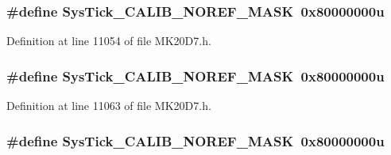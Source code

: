\subsubsection[{\texorpdfstring{Sys\+Tick\+\_\+\+C\+A\+L\+I\+B\+\_\+\+N\+O\+R\+E\+F\+\_\+\+M\+A\+SK}{SysTick_CALIB_NOREF_MASK}}]{\setlength{\rightskip}{0pt plus 5cm}\#define Sys\+Tick\+\_\+\+C\+A\+L\+I\+B\+\_\+\+N\+O\+R\+E\+F\+\_\+\+M\+A\+SK~0x80000000u}\hypertarget{group___sys_tick___register___masks_gabca0ac6719f78220d81d2fc1328d5a45}{}\label{group___sys_tick___register___masks_gabca0ac6719f78220d81d2fc1328d5a45}


Definition at line 11054 of file M\+K20\+D7.\+h.

\subsubsection[{\texorpdfstring{Sys\+Tick\+\_\+\+C\+A\+L\+I\+B\+\_\+\+N\+O\+R\+E\+F\+\_\+\+M\+A\+SK}{SysTick_CALIB_NOREF_MASK}}]{\setlength{\rightskip}{0pt plus 5cm}\#define Sys\+Tick\+\_\+\+C\+A\+L\+I\+B\+\_\+\+N\+O\+R\+E\+F\+\_\+\+M\+A\+SK~0x80000000u}\hypertarget{group___sys_tick___register___masks_gabca0ac6719f78220d81d2fc1328d5a45}{}\label{group___sys_tick___register___masks_gabca0ac6719f78220d81d2fc1328d5a45}


Definition at line 11063 of file M\+K20\+D7.\+h.

\subsubsection[{\texorpdfstring{Sys\+Tick\+\_\+\+C\+A\+L\+I\+B\+\_\+\+N\+O\+R\+E\+F\+\_\+\+M\+A\+SK}{SysTick_CALIB_NOREF_MASK}}]{\setlength{\rightskip}{0pt plus 5cm}\#define Sys\+Tick\+\_\+\+C\+A\+L\+I\+B\+\_\+\+N\+O\+R\+E\+F\+\_\+\+M\+A\+SK~0x80000000u}\hypertarget{group___sys_tick___register___masks_gabca0ac6719f78220d81d2fc1328d5a45}{}\label{group___sys_tick___register___masks_gabca0ac6719f78220d81d2fc1328d5a45}


